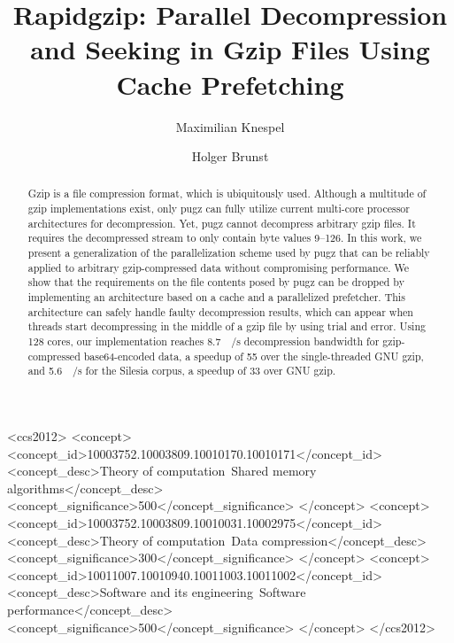 \documentclass[sigconf,screen,authorversion,pbalance]{acmart}
\newcommand{\Pragzip}{Rapidgzip\xspace}
\begin{document}
\title{\Pragzip: Parallel Decompression and Seeking in Gzip Files Using Cache Prefetching}



\author{Maximilian Knespel}


\author{Holger Brunst}



\begin{abstract}
Gzip is a file compression format, which is ubiquitously used.
Although a multitude of gzip implementations exist, only pugz can fully utilize current multi-core processor architectures for decompression.
Yet, pugz cannot decompress arbitrary gzip files.
It requires the decompressed stream to only contain byte values 9--126.
In this work, we present a generalization of the parallelization scheme used by pugz that can be reliably applied to arbitrary gzip-compressed data without compromising performance.
We show that the requirements on the file contents posed by pugz can be dropped by implementing an architecture based on a cache and a parallelized prefetcher.
This architecture can safely handle faulty decompression results, which can appear when threads start decompressing in the middle of a gzip file by using trial and error.
Using 128 cores, our implementation reaches \SI{8.7}{\giga\byte/\second} decompression bandwidth for gzip-compressed base64-encoded data, a speedup of 55 over the single-threaded GNU gzip, and \SI{5.6}{\giga\byte/\second} for the Silesia corpus, a speedup of \num{33} over GNU gzip.
\end{abstract}

\begin{CCSXML}
<ccs2012>
   <concept>
       <concept_id>10003752.10003809.10010170.10010171</concept_id>
       <concept_desc>Theory of computation~Shared memory algorithms</concept_desc>
       <concept_significance>500</concept_significance>
       </concept>
   <concept>
       <concept_id>10003752.10003809.10010031.10002975</concept_id>
       <concept_desc>Theory of computation~Data compression</concept_desc>
       <concept_significance>300</concept_significance>
       </concept>
   <concept>
       <concept_id>10011007.10010940.10011003.10011002</concept_id>
       <concept_desc>Software and its engineering~Software performance</concept_desc>
       <concept_significance>500</concept_significance>
       </concept>
 </ccs2012>
\end{CCSXML}
\end{document}
